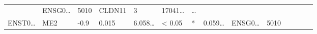 \documentclass[
]{article}
\begin{document}
\begin{longtable}[]{@{}llllllllllllll@{}}
\begin{minipage}[t]{0.05\columnwidth}
\end{minipage} & \begin{minipage}[t]{0.05\columnwidth}\raggedright
ENSG0\ldots{}\strut
\end{minipage} & \begin{minipage}[t]{0.05\columnwidth}\raggedright
5010\strut
\end{minipage} & \begin{minipage}[t]{0.05\columnwidth}\raggedright
CLDN11\strut
\end{minipage} & \begin{minipage}[t]{0.05\columnwidth}\raggedright
3\strut
\end{minipage} & \begin{minipage}[t]{0.05\columnwidth}\raggedright
17041\ldots{}\strut
\end{minipage} & \begin{minipage}[t]{0.02\columnwidth}\raggedright
\ldots{}\strut
\end{minipage}\tabularnewline
\begin{minipage}[t]{0.05\columnwidth}\raggedright
ENST0\ldots{}\strut
\end{minipage} & \begin{minipage}[t]{0.04\columnwidth}\raggedright
ME2\strut
\end{minipage} & \begin{minipage}[t]{0.04\columnwidth}\raggedright
-0.9\strut
\end{minipage} & \begin{minipage}[t]{0.04\columnwidth}\raggedright
0.015\strut
\end{minipage} & \begin{minipage}[t]{0.05\columnwidth}\raggedright
6.058\ldots{}\strut
\end{minipage} & \begin{minipage}[t]{0.05\columnwidth}\raggedright
\textless{} 0.05\strut
\end{minipage} & \begin{minipage}[t]{0.03\columnwidth}\raggedright
*\strut
\end{minipage} & \begin{minipage}[t]{0.05\columnwidth}\raggedright
0.059\ldots{}\strut
\end{minipage} & \begin{minipage}[t]{0.05\columnwidth}\raggedright
ENSG0\ldots{}\strut
\end{minipage} & \begin{minipage}[t]{0.05\columnwidth}\raggedright
5010\strut

\end{minipage}
\end{longtable}
\end{document}
